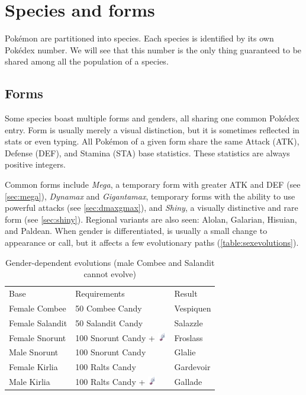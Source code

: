 \chapter{Species and forms}
\label{chap:species}
Pokémon are partitioned into species.
Each species is identified by its own Pokédex number.
We will see that this number is the only thing guaranteed to be shared among all the population of a species.

\section{Forms}
\label{sec:forms}
Some species boast multiple forms and genders, all sharing one common Pokédex entry.
Form is usually merely a visual distinction, but it is sometimes reflected
 in stats or even typing.
All Pokémon of a given form share the same Attack (ATK), Defense (DEF), and
 Stamina (STA) base statistics.
These statistics are always positive integers.

Common forms include \textit{Mega}, a temporary form with greater ATK and DEF (see \autoref{sec:mega}),
  \textit{Dynamax} and \textit{Gigantamax}, temporary forms with the ability to use
  powerful attacks (see \autoref{sec:dmaxgmax}),
  and \textit{Shiny}, a visually distinctive and rare form (see \autoref{sec:shiny}).
Regional variants are also seen: Alolan, Galarian, Hisuian, and Paldean.
When gender is differentiated, is usually a small change to appearance or call,
 but it affects a few evolutionary paths (\autoref{table:sexevolutions}).
\begin{table}
\footnotesize
\centering
\begin{tabular}{lll}
Base & Requirements & Result \\
\Midrule
Female Combee	& 50 Combee Candy & Vespiquen\\
Female Salandit & 50 Salandit Candy & Salazzle\\
Female Snorunt & 100 Snorunt Candy + \includegraphics[width=1em,height=1em]{images/sinnohstone.png} & Froslass\\
Male Snorunt & 100 Snorunt Candy & Glalie\\
Female Kirlia & 100 Ralts Candy & Gardevoir\\
Male Kirlia & 100 Ralts Candy + \includegraphics[width=1em,height=1em]{images/sinnohstone.png} & Gallade\\
\end{tabular}
\caption[Gender-dependent evolutions]{Gender-dependent evolutions (male Combee and Salandit cannot evolve)}
\label{table:sexevolutions}
\end{table}

